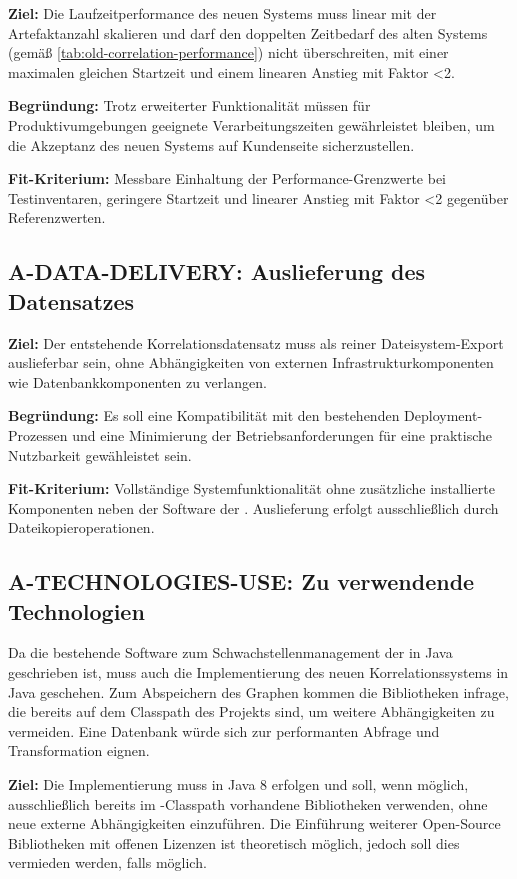 \textbf{Ziel:}
Die Laufzeitperformance des neuen Systems muss linear mit der Artefaktanzahl skalieren und darf den doppelten Zeitbedarf des alten Systems (gemäß \autoref{tab:old-correlation-performance}) nicht überschreiten, mit einer maximalen gleichen Startzeit und einem linearen Anstieg mit Faktor <2.

\textbf{Begründung:}
Trotz erweiterter Funktionalität müssen für Produktivumgebungen geeignete Verarbeitungszeiten gewährleistet bleiben, um die Akzeptanz des neuen Systems auf Kundenseite sicherzustellen.

\textbf{Fit-Kriterium:}
Messbare Einhaltung der Performance-Grenzwerte bei Testinventaren, geringere Startzeit und linearer Anstieg mit Faktor <2 gegenüber Referenzwerten.

\subsection{A-DATA-DELIVERY: Auslieferung des Datensatzes}\label{subsec:req-correlation-data-delivery}

\textbf{Ziel:}
Der entstehende Korrelationsdatensatz muss als reiner Dateisystem-Export auslieferbar sein, ohne Abhängigkeiten von externen Infrastrukturkomponenten wie Datenbankkomponenten zu verlangen.

\textbf{Begründung:}
Es soll eine Kompatibilität mit den bestehenden Deployment-Prozessen und eine Minimierung der Betriebsanforderungen für eine praktische Nutzbarkeit gewähleistet sein.

\textbf{Fit-Kriterium:}
Vollständige Systemfunktionalität ohne zusätzliche installierte Komponenten neben der Software der \metaeffekt.
Auslieferung erfolgt ausschließlich durch Dateikopieroperationen.

\subsection{A-TECHNOLOGIES-USE: Zu verwendende Technologien}\label{subsec:req-lang-java}

Da die bestehende Software zum Schwachstellenmanagement der \metaeffektsp in Java geschrieben ist, muss auch die Implementierung des neuen Korrelationssystems in Java geschehen.
Zum Abspeichern des Graphen kommen die Bibliotheken infrage, die bereits auf dem Classpath des Projekts sind, um weitere Abhängigkeiten zu vermeiden.
Eine Datenbank würde sich zur performanten Abfrage und Transformation eignen.

\textbf{Ziel:}
Die Implementierung muss in Java 8 erfolgen und soll, wenn möglich, ausschließlich bereits im \metaeffekt-Classpath vorhandene Bibliotheken verwenden, ohne neue externe Abhängigkeiten einzuführen.
Die Einführung weiterer Open-Source Bibliotheken mit offenen Lizenzen ist theoretisch möglich, jedoch soll dies vermieden werden, falls möglich.

